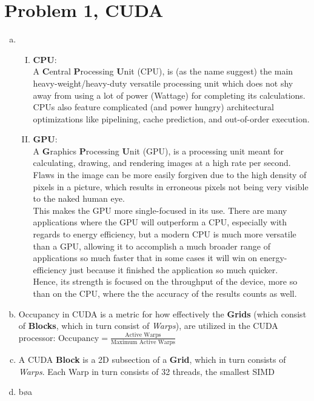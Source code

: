 \documentclass[fontsize=11pt, paper=a4, titlepage]{article}
\begin{document}
\section*{Problem 1, CUDA}
\begin{enumerate}[a)]

    \item
    \begin{enumerate}[I)]

        \item \textbf{CPU}: \\
A \textbf{C}entral \textbf{P}rocessing \textbf{U}nit (CPU), is (as the
name suggest) the main heavy-weight/heavy-duty versatile processing unit which
does not shy away from using a lot of power (Wattage) for completing its
calculations. CPUs also feature complicated (and power hungry) architectural
optimizations like pipelining, cache prediction, and out-of-order execution.

        \item \textbf{GPU}: \\
A \textbf{G}raphics \textbf{P}rocessing \textbf{U}nit (GPU), is a processing
unit meant for calculating, drawing, and rendering images at a high rate per
second. Flaws in the image can be more easily forgiven due to the high density
of pixels in a picture, which results in erroneous pixels not being very visible
to the naked human eye. \\

This makes the GPU more single-focused in its use. There are many applications
where the GPU will outperform a CPU, especially with regards to energy
efficiency, but a modern CPU is much more versatile than a GPU, allowing it to
accomplish a much broader range of applications so much faster that in some
cases it will win on energy-efficiency just because it finished the application
so much quicker. \\

Hence, its strength is focused on the throughput of the device, more so than on
the CPU, where the the accuracy of the results counts as well.

\end{enumerate}

    \item Occupancy in CUDA is a metric for how effectively the \textbf{Grids}
(which consist of \textbf{Blocks}, which in turn consist of \textit{Warps}), are
utilized in the CUDA processor: $\text{Occupancy} = \frac{\text{Active
Warps}}{\text{Maximum Active Warps}}$

    \item A CUDA \textbf{Block} is a 2D subsection of a \textbf{Grid}, which in
turn consists of \textit{Warps}. Each Warp in turn consists of 32 threads, the
smallest SIMD

    \item bøa

\end{enumerate}
\end{document}
